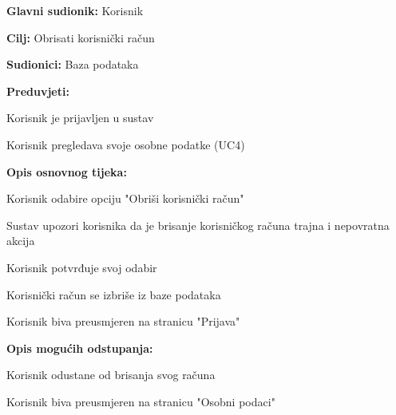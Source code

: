 					\noindent {}
					\begin{packed_item}
	
						\item \textbf{Glavni sudionik: }Korisnik
						\item  \textbf{Cilj:} Obrisati korisnički račun
						\item  \textbf{Sudionici:} Baza podataka
						\item  \textbf{Preduvjeti:}
						\item[] \begin{packed_enum}
							\item Korisnik je prijavljen u sustav
							\item Korisnik pregledava svoje osobne podatke (UC4)
						\end{packed_enum}
						\item  \textbf{Opis osnovnog tijeka:}
						
						\item[] \begin{packed_enum}
	
							\item Korisnik odabire opciju "Obriši korisnički račun"
							\item Sustav upozori korisnika da je brisanje korisničkog računa trajna i nepovratna akcija
							\item Korisnik potvrđuje svoj odabir
							\item Korisnički račun se izbriše iz baze podataka
							\item Korisnik biva preusmjeren na stranicu "Prijava"
							
						\end{packed_enum}
						
						\item  \textbf{Opis mogućih odstupanja:}
						
						\item[] \begin{packed_item}
	
							\item[4.a] Korisnik odustane od brisanja svog računa
							\item[] \begin{packed_enum}
								
								\item Korisnik biva preusmjeren na stranicu "Osobni podaci"
														
							\end{packed_enum}
							
						\end{packed_item}
					\end{packed_item}
					
